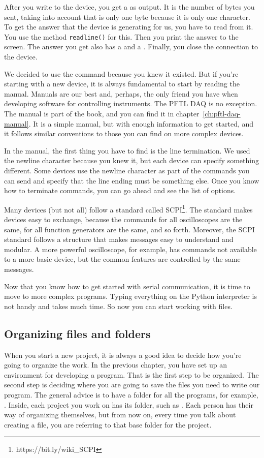 After you write to the device, you get a  as output. It is the number of bytes you sent, taking into account that \texttt{\n} is only one byte because it is only one character. To get the answer that the device is generating for us, you have to read from it. You use the method \texttt{readline()} for this. Then you print the answer to the screen. The answer you get also has a \py{\n} and a . Finally, you close the connection to the device.

We decided to use the  command because you knew it existed. But if you're starting with a new device, it is always fundamental to start by reading the manual. Manuals are our best and, perhaps, the only friend you have when developing software for controlling instruments. The {PFTL DAQ} is no exception. The manual is part of the book, and you can find it in chapter~\ref{ch:pftl-daq-manual}. It is a simple manual, but with enough information to get started, and it follows similar conventions to those you can find on more complex devices.

In the manual, the first thing you have to find is the line termination. We used the newline character because you knew it, but each device can specify something different. Some devices use the newline character as part of the commands you can send and specify that the line ending must be something else. Once you know how to terminate commands, you can go ahead and see the list of options.

Many devices (but not all) follow a standard called SCPI\footnote{https://bit.ly/wiki\_SCPI}. The standard makes devices easy to exchange, because the commands for all oscilloscopes are the same, for all function generators are the same, and so forth. Moreover, the SCPI standard follows a structure that makes messages easy to understand and modular. A more powerful oscilloscope, for example, has commands not available to a more basic device, but the common features are controlled by the same messages.

Now that you know how to get started with serial communication, it is time to move to more complex programs. Typing everything on the Python interpreter is not handy and takes much time. So now you can start working with files.

\subsection{Organizing files and folders}\label{subsec:organizing-files-and-folders}
When you start a new project, it is always a good idea to decide how you're going to organize the work. In the previous chapter, you have set up an environment for developing a program. That is the first step to be organized. The second step is deciding where you are going to save the files you need to write our program. The general advice is to have a folder for all the programs, for example, . Inside, each project you work on has its folder, such as . Each person has their way of organizing themselves, but from now on, every time you talk about creating a file, you are referring to that base folder for the project.

